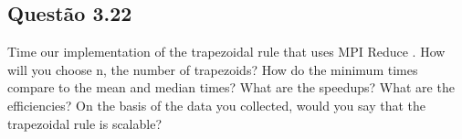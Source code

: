 

\subsection{Questão 3.22}

Time our implementation of the trapezoidal rule that uses MPI Reduce . How will you choose n, the number of trapezoids? How do the minimum times compare to the mean and median times? What are the speedups? What are the efficiencies? On the basis of the data you collected, would you say that the trapezoidal rule is scalable?

